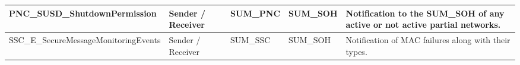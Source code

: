 \begin{longtable}{|l|l|l|l|l|}
\begin{minipage}{0.42\linewidth}\raggedright\vspace{.75ex}PNC\_SUSD\_ShutdownPermission\vspace{.75ex}\end{minipage} & \begin{minipage}{0.07\linewidth}\raggedright\vspace{.75ex}Sender / Receiver\vspace{.75ex}\end{minipage} & \begin{minipage}{0.10\linewidth}\raggedright\vspace{.75ex}SUM\_PNC\vspace{.75ex}\end{minipage} & \begin{minipage}{0.10\linewidth}\raggedright\vspace{.75ex}SUM\_SOH\vspace{.75ex}\end{minipage} & \begin{minipage}{0.17\linewidth}\raggedright\vspace{.75ex}Notification to the SUM\_SOH of any active or not active partial networks.\vspace{.75ex}\end{minipage}\\\hline
\begin{minipage}{0.42\linewidth}\raggedright\vspace{.75ex}SSC\_E\_SecureMessageMonitoringEvents\vspace{.75ex}\end{minipage} & \begin{minipage}{0.07\linewidth}\raggedright\vspace{.75ex}Sender / Receiver\vspace{.75ex}\end{minipage} & \begin{minipage}{0.10\linewidth}\raggedright\vspace{.75ex}SUM\_SSC\vspace{.75ex}\end{minipage} & \begin{minipage}{0.10\linewidth}\raggedright\vspace{.75ex}SUM\_SOH\vspace{.75ex}\end{minipage} & \begin{minipage}{0.17\linewidth}\raggedright\vspace{.75ex}Notification of MAC failures along with their types.\vspace{.75ex}\end{minipage}\\\hline

\end{longtable}
